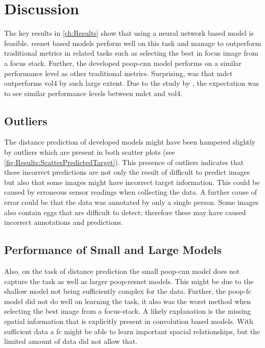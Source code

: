 \chapter{Discussion}
\label{ch:Discussion}

The key results in \autoref{ch:Results} show that using a neural network based model is feasible. \Ac{resnet} based models perform well on this task and manage to outperform traditional metrics in related tasks such as selecting the best in focus image from a focus stack. Further, the developed \ac{poop}-\ac{cnn} model performs on a similar performance level as other traditional metrics. Surprising, was that \ac{mdct} outperforms \ac{vol4} by such large extent. Due to the study by \textcite{mateos-perez2012comparative}, the expectation was to see similar performance levels between \ac{mdct} and \ac{vol4}.

\section{Outliers}
\label{ch:Discussion:Outliers}

The distance prediction of developed models might have been hampered slightly by outliers which are present in both scatter plots (see \autoref{fig:Results:ScatterPredictedTarget}). This presence of outliers indicates that these incorrect predictions are not only the result of difficult to predict images but also that some images might have incorrect target information. This could be caused by erroneous sensor readings when collecting the data. A further cause of error could be that the data was annotated by only a single person. Some images also contain eggs that are difficult to detect; therefore these may have caused incorrect annotations and predictions.

\section{Performance of Small and Large Models}
\label{ch:Discussion:SmallandLarge}

Also, on the task of distance prediction the small \ac{poop}-{cnn} model does not capture the task as well as larger \ac{poop}-\ac{resnet} models. This might be due to the shallow model not being sufficiently complex for the data. Further, the \ac{poop}-\ac{fc} model did not do well on learning the task, it also was the worst method when selecting the best image from a focus-stack. A likely explanation is the missing spatial information that is explicitly present in convolution based models. With sufficient data a \ac{fc} might be able to learn important spacial relationships, but the limited amount of data did not allow that.

